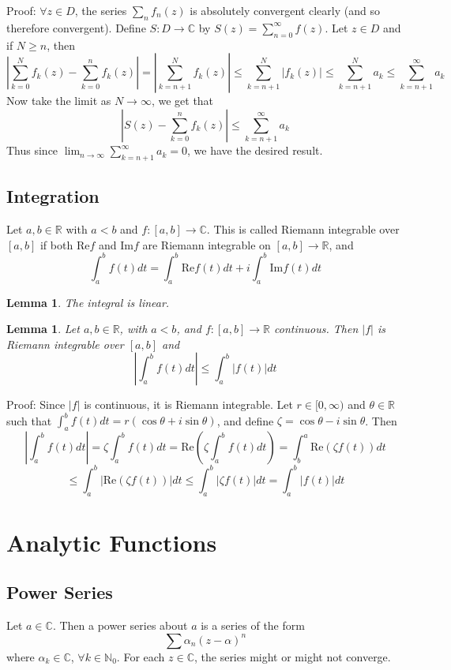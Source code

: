 \documentclass[11pt]{article}
\theoremstyle{plain}
\newtheorem{lemma}[theorem]{Lemma}
\theoremstyle{definition}
\newcommand{\re}[0]{\text{Re}}
\newcommand{\im}[0]{\text{Im}}
\begin{document}
Proof: $\forall z \in D$, the series $\sum_{n} f_n(z)$ is absolutely convergent clearly (and so therefore convergent). Define $S: D \to \mathbb{C}$ by $S(z) = \sum_{n = 0}^{\infty} f(z)$. Let $z \in D$ and if $N \geq n$, then 
$$ \left| \sum_{k=0}^{N}f_k(z)- \sum_{k = 0}^{n}f_k(z)\right| = \left| \sum_{k = n+1}^{N} f_k(z) \right| \leq \sum_{k = n+1}^{N} |f_k(z)| \leq \sum_{k = n+1}^N a_k \leq \sum_{k = n+1}^{\infty} a_k $$
Now take the limit as $N \to \infty$, we get that 
$$ \left|S(z) - \sum_{k = 0}^n f_k(z)\right| \leq \sum_{k = n+1}^{\infty} a_k $$
Thus since $\lim_{n \to\infty} \sum_{k = n+1}^{\infty} a_k = 0$, we have the desired result.

\subsection{Integration}
Let $a, b \in \mathbb{R}$ with $a<b$ and $f:[a,b] \to \mathbb{C}$. This is called Riemann integrable over $[a, b]$ if both $\re f$ and $\im f$ are Riemann integrable on $[a,b] \to \mathbb{R}$, and 
$$ \int_a^b f(t)dt = \int_a^b \re f(t)dt + i\int_a^b \im f(t)dt $$

\begin{lemma}
The integral is linear.
\end{lemma}

\begin{lemma}
Let $a, b \in \mathbb{R}$, with $a<b$, and $f:[a,b] \to \mathbb{R}$ continuous. Then $|f|$ is Riemann integrable over $[a,b]$ and 
$$ \left| \int_a^b f(t)dt \right| \leq \int_a^b |f(t)|dt $$
\end{lemma}

Proof: Since $|f|$ is continuous, it is Riemann integrable. Let $r \in [0, \infty)$ and $\theta \in \mathbb{R}$ such that $\int_a^b f(t)dt = r(\cos \theta + i \sin\theta)$, and define $\zeta = \cos \theta - i \sin \theta$. Then 
$$ \left| \int_a^b f(t)dt \right| = \zeta \int_a^b f(t)dt = \re (\zeta \int_a^b f(t)dt) = \int_b^a \re (\zeta f(t))dt $$
$$ \leq \int_a^b \left| \re (\zeta f(t))\right|dt \leq \int_a^b |\zeta f(t)|dt = \int_a^b |f(t)|dt $$

\section{Analytic Functions}
\subsection{Power Series} 
Let $a \in \mathbb{C}$. Then a power series about $a$ is a series of the form 
$$ \sum \alpha_n(z - \alpha)^n $$
where $\alpha_k \in \mathbb{C}$, $\forall k \in \mathbb{N}_0$. For each $z \in \mathbb{C}$, the series might or might not converge.
\end{document}
